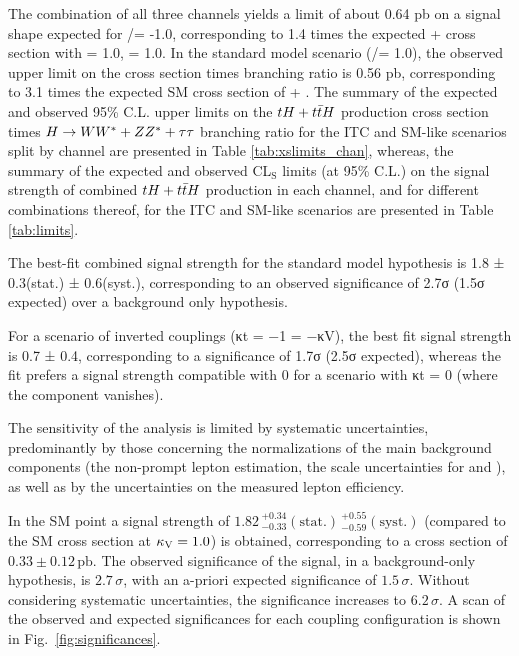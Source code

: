 The combination of all three channels yields a limit of about 0.64 pb on a signal shape expected for \Ct/\CV = -1.0, corresponding to 1.4 times the expected \tH + \ttH cross section with \Ct = 1.0, \CV = 1.0. In the standard model scenario (\Ct/\CV = 1.0), the observed upper limit on the cross section times branching ratio is 0.56 pb, corresponding to 3.1 times the expected SM cross section of \tH + \ttH. The summary of the expected and observed 95\% C.L. upper limits on the $tH+t\bar{t}H$ production cross section times $H\to WW^*+ ZZ^* +\tau\tau$ branching ratio for the ITC and SM-like scenarios split by channel are presented in Table \ref{tab:xslimits_chan}, whereas, the summary of the expected and observed CL$_\text{S}$ limits (at 95\% C.L.) on the signal strength of combined $tH+t\bar{t}H$ production in each channel, and for different combinations thereof, for the ITC  and SM-like scenarios are presented in Table \ref{tab:limits}.










The best-fit combined signal strength for the standard model hypothesis is 1.8 ± 0.3(stat.) ± 0.6(syst.), corresponding to an observed significance of 2.7σ (1.5σ expected) over a background only
hypothesis.



For a scenario of inverted couplings (κt = −1 = −κV), the best fit signal strength is 0.7 ± 0.4, corresponding to a significance of 1.7σ (2.5σ expected), whereas the fit prefers a signal strength compatible with 0 for a scenario with κt = 0 (where the \ttH component vanishes).


The sensitivity of the analysis is limited by systematic uncertainties, predominantly by those concerning the normalizations of the main background components (the non-prompt lepton estimation, the scale uncertainties for \ttW and \ttZ), as well as by the uncertainties on the measured lepton efficiency.








 In the SM point a signal strength of $1.82\,^{+0.34}_{-0.33}\mathrm{(stat.)}\,^{+0.55}_{-0.59}\mathrm{(syst.)}$ (compared to the SM cross section at $\kappa_\text{V}=1.0$) is obtained, corresponding to a cross section of $0.33\pm0.12\,\mathrm{pb}$. The observed significance of the signal, in a background-only hypothesis, is $2.7\,\sigma$, with an a-priori expected significance of $1.5\,\sigma$. Without considering systematic uncertainties, the significance increases to $6.2\,\sigma$. A scan of the observed and expected significances for each coupling configuration is shown in Fig.~\ref{fig:significances}.


